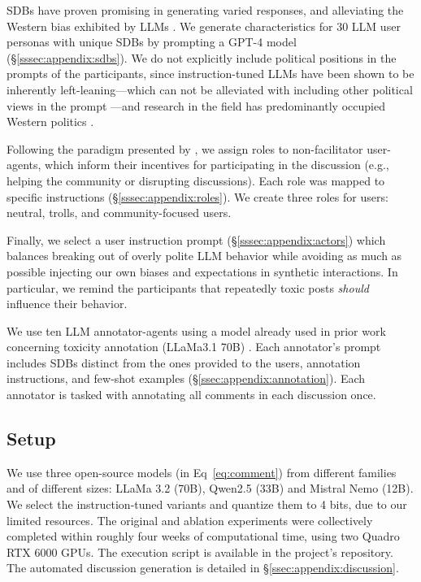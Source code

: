 \acfp{SDB} have proven promising in generating varied responses, and alleviating the Western bias exhibited by \acp{LLM} \cite{burton2024large}. We generate characteristics for 30 \ac{LLM} user personas with unique \acp{SDB} by prompting a GPT-4 model \cite{openai2024gpt4technicalreport} (\S\ref{sssec:appendix:sdbs}). We do not explicitly include political positions in the prompts of the participants, since instruction-tuned \acp{LLM} have been shown to be inherently left-leaning---which can not be alleviated with including other political views in the prompt \cite{Taubenfeld2024SystematicBI}---and research in the field has predominantly occupied Western politics \cite{Taubenfeld2024SystematicBI, potter-etal-2024-hidden, political_2024, pit2024oninvestigatingpoliticalstance}. %

Following the paradigm presented by \citet{abdelnabi_negotiations}, we assign roles to non-facilitator user-agents, which inform their incentives for participating in the discussion (e.g., helping the community or disrupting discussions). Each role was mapped to specific instructions (\S\ref{sssec:appendix:roles}). We create three roles for users: neutral, trolls, and community-focused users. 

Finally, we select a user instruction prompt (\S\ref{sssec:appendix:actors}) which balances breaking out of overly polite \ac{LLM} behavior while avoiding as much as possible injecting our own biases and expectations in synthetic interactions. In particular, we remind the participants that repeatedly toxic posts \emph{should} influence their behavior. 

We use ten \ac{LLM} annotator-agents using a model already used in prior work concerning toxicity annotation (LLaMa3.1 70B) \cite{kang-qian-2024-implanting}. Each annotator's prompt includes \acp{SDB} distinct from the ones provided to the users, annotation instructions, and few-shot examples (\S\ref{ssec:appendix:annotation}). Each annotator is tasked with annotating all comments in each discussion once.


\subsection{Setup}
\label{ssec:experimental:setup}

We use three open-source models (in Eq~\ref{eq:comment}) from different families and of different sizes: LLaMa 3.2 (70B), Qwen2.5 (33B) and Mistral Nemo (12B). We select the instruction-tuned variants and quantize them to 4 bits, due to our limited resources. The original and ablation experiments were collectively completed within roughly four weeks of computational time, using two Quadro RTX 6000 GPUs. The execution script is available in the project's repository\analysislink. The automated discussion generation is detailed in \S\ref{ssec:appendix:discussion}.

